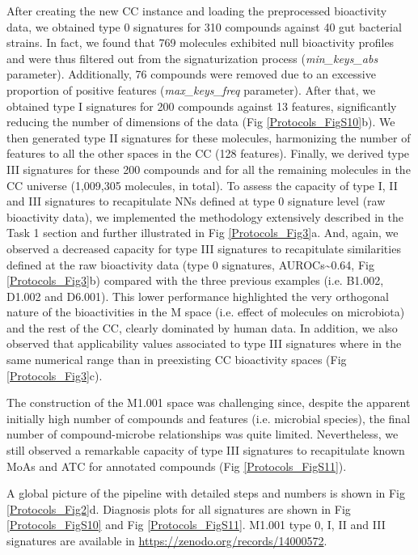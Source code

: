 After creating the new CC instance and loading the preprocessed bioactivity data, we obtained type 0 signatures for 310 compounds against 40 gut bacterial strains. In fact, we found that 769 molecules exhibited null bioactivity profiles and were thus filtered out from the signaturization process (\textit{min\_keys\_abs} parameter). Additionally, 76 compounds were removed due to an excessive proportion of positive features (\textit{max\_keys\_freq} parameter). After that, we obtained type I signatures for 200 compounds against 13 features, significantly reducing the number of dimensions of the data (Fig \ref{Protocols_FigS10}b). We then generated type II signatures for these molecules, harmonizing the number of features to all the other spaces in the CC (128 features). Finally, we derived type III signatures for these 200 compounds and for all the remaining molecules in the CC universe (1,009,305 molecules, in total). To assess the capacity of type I, II and III signatures to recapitulate NNs defined at type 0 signature level (raw bioactivity data), we implemented the methodology extensively described in the Task 1 section and further illustrated in Fig \ref{Protocols_Fig3}a. And, again, we observed a decreased capacity for type III signatures to recapitulate similarities defined at the raw bioactivity data (type 0 signatures, AUROCs\textasciitilde0.64, Fig \ref{Protocols_Fig3}b) compared with the three previous examples (i.e. B1.002, D1.002 and D6.001). This lower performance highlighted the very orthogonal nature of the bioactivities in the M space (i.e. effect of molecules on microbiota) and the rest of the CC, clearly dominated by human data. In addition, we also observed that applicability values associated to type III signatures where in the same numerical range than in preexisting CC bioactivity spaces (Fig \ref{Protocols_Fig3}c).

The construction of the M1.001 space was challenging since, despite the apparent initially high number of compounds and features (i.e. microbial species), the final number of compound-microbe relationships was quite limited. Nevertheless, we still observed a remarkable capacity of type III signatures to recapitulate known MoAs and ATC for annotated compounds (Fig \ref{Protocols_FigS11}).

A global picture of the pipeline with detailed steps and numbers is shown in Fig \ref{Protocols_Fig2}d. Diagnosis plots for all signatures are shown in Fig \ref{Protocols_FigS10} and Fig \ref{Protocols_FigS11}. M1.001 type 0, I, II and III signatures are available in \hyperlink{https://zenodo.org/records/14000572}{https://zenodo.org/records/14000572}. 

